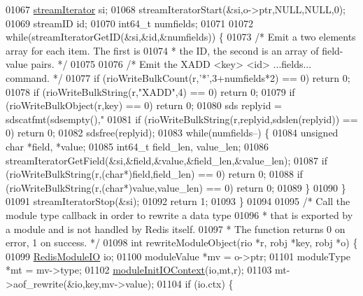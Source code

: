 \begin{DoxyCode}
{{{{{{{{{{{{{{{01067     \hyperlink{structstreamIterator}{streamIterator} si;
01068     streamIteratorStart(&si,o->ptr,NULL,NULL,0);
01069     streamID id;
01070     int64\_t numfields;
01071 
01072     \textcolor{keywordflow}{while}(streamIteratorGetID(&si,&id,&numfields)) \{
01073         \textcolor{comment}{/* Emit a two elements array for each item. The first is}
01074 \textcolor{comment}{         * the ID, the second is an array of field-value pairs. */}
01075 
01076         \textcolor{comment}{/* Emit the XADD <key> <id> ...fields... command. */}
01077         \textcolor{keywordflow}{if} (rioWriteBulkCount(r,\textcolor{stringliteral}{'*'},3+numfields*2) == 0) \textcolor{keywordflow}{return} 0;
01078         \textcolor{keywordflow}{if} (rioWriteBulkString(r,\textcolor{stringliteral}{"XADD"},4) == 0) \textcolor{keywordflow}{return} 0;
01079         \textcolor{keywordflow}{if} (rioWriteBulkObject(r,key) == 0) \textcolor{keywordflow}{return} 0;
01080         sds replyid = sdscatfmt(sdsempty(),\textcolor{stringliteral}{"%
01081         \textcolor{keywordflow}{if} (rioWriteBulkString(r,replyid,sdslen(replyid)) == 0) \textcolor{keywordflow}{return} 0;
01082         sdsfree(replyid);
01083         \textcolor{keywordflow}{while}(numfields--) \{
01084             \textcolor{keywordtype}{unsigned} \textcolor{keywordtype}{char} *field, *value;
01085             int64\_t field\_len, value\_len;
01086             streamIteratorGetField(&si,&field,&value,&field\_len,&value\_len);
01087             \textcolor{keywordflow}{if} (rioWriteBulkString(r,(\textcolor{keywordtype}{char}*)field,field\_len) == 0) \textcolor{keywordflow}{return} 0;
01088             \textcolor{keywordflow}{if} (rioWriteBulkString(r,(\textcolor{keywordtype}{char}*)value,value\_len) == 0) \textcolor{keywordflow}{return} 0;
01089         \}
01090     \}
01091     streamIteratorStop(&si);
01092     \textcolor{keywordflow}{return} 1;
01093 \}
01094 
01095 \textcolor{comment}{/* Call the module type callback in order to rewrite a data type}
01096 \textcolor{comment}{ * that is exported by a module and is not handled by Redis itself.}
01097 \textcolor{comment}{ * The function returns 0 on error, 1 on success. */}
01098 \textcolor{keywordtype}{int} rewriteModuleObject(rio *r, robj *key, robj *o) \{
01099     \hyperlink{structRedisModuleIO}{RedisModuleIO} io;
01100     moduleValue *mv = o->ptr;
01101     moduleType *mt = mv->type;
01102     \hyperlink{server_8h_abe94415e34ee463788c4c863dc029908}{moduleInitIOContext}(io,mt,r);
01103     mt->aof\_rewrite(&io,key,mv->value);
01104     \textcolor{keywordflow}{if} (io.ctx) \{
}}}}}}}}}}}}}}}}
\end{DoxyCode}
